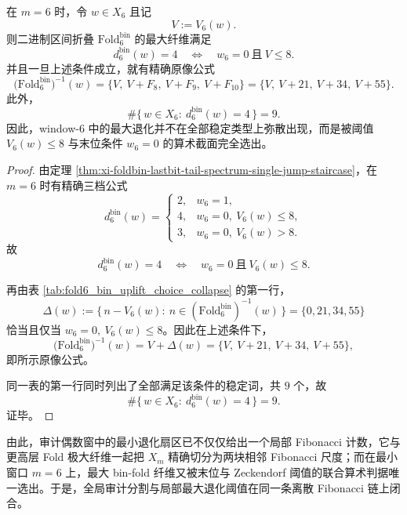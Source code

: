 \begin{theorem}\label{thm:xi-time-part60ad-window6-max-binfold-arithmetic-threshold}
在 \(m=6\) 时，令 \(w\in X_6\) 且记
\[
V:=V_6(w).
\]
则二进制区间折叠 \(\mathrm{Fold}^{\mathrm{bin}}_6\) 的最大纤维满足
\[
d_6^{\mathrm{bin}}(w)=4
\quad\Longleftrightarrow\quad
w_6=0\ \text{且}\ V\le 8.
\]
并且一旦上述条件成立，就有精确原像公式
\[
\bigl(\mathrm{Fold}^{\mathrm{bin}}_6\bigr)^{-1}(w)
=
\{V,\ V+F_8,\ V+F_9,\ V+F_{10}\}
=
\{V,\ V+21,\ V+34,\ V+55\}.
\]
此外，
\[
\#\{\,w\in X_6:\ d_6^{\mathrm{bin}}(w)=4\,\}=9.
\]
因此，window-\(6\) 中的最大退化并不在全部稳定类型上弥散出现，而是被阈值 \(V_6(w)\le 8\) 与末位条件 \(w_6=0\) 的算术截面完全选出。
\end{theorem}
\begin{proof}
由定理 \ref{thm:xi-foldbin-lastbit-tail-spectrum-single-jump-staircase}，在 \(m=6\) 时有精确三档公式
\[
d_6^{\mathrm{bin}}(w)=
\begin{cases}
2,& w_6=1,\\[4pt]
4,& w_6=0,\ V_6(w)\le 8,\\[4pt]
3,& w_6=0,\ V_6(w)>8.
\end{cases}
\]
故
\[
d_6^{\mathrm{bin}}(w)=4
\quad\Longleftrightarrow\quad
w_6=0\ \text{且}\ V_6(w)\le 8.
\]

再由表 \ref{tab:fold6_bin_uplift_choice_collapse} 的第一行，
\[
\Delta(w):=\{\,n-V_6(w):\ n\in(\mathrm{Fold}^{\mathrm{bin}}_6)^{-1}(w)\,\}
=
\{0,21,34,55\}
\]
恰当且仅当 \(w_6=0,\ V_6(w)\le 8\)。因此在上述条件下，
\[
\bigl(\mathrm{Fold}^{\mathrm{bin}}_6\bigr)^{-1}(w)
=
V+\Delta(w)
=
\{V,\ V+21,\ V+34,\ V+55\},
\]
即所示原像公式。

同一表的第一行同时列出了全部满足该条件的稳定词，共 \(9\) 个，故
\[
\#\{\,w\in X_6:\ d_6^{\mathrm{bin}}(w)=4\,\}=9.
\]
证毕。
\end{proof}

\noindent
由此，审计偶数窗中的最小退化扇区已不仅仅给出一个局部 Fibonacci 计数，它与更高层 Fold 极大纤维一起把 \(X_m\) 精确切分为两块相邻 Fibonacci 尺度；而在最小窗口 \(m=6\) 上，最大 bin-fold 纤维又被末位与 Zeckendorf 阈值的联合算术判据唯一选出。于是，全局审计分割与局部最大退化阈值在同一条离散 Fibonacci 链上闭合。

\endinput
